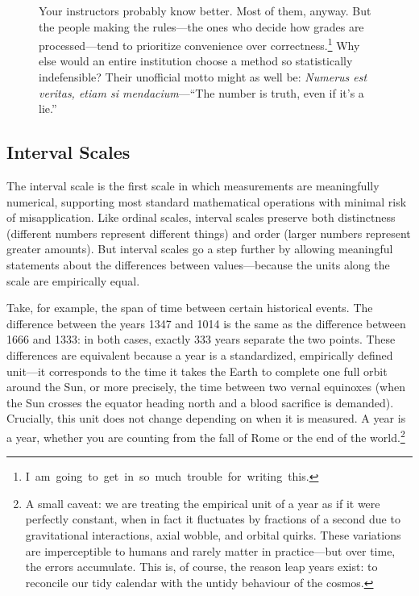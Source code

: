 \begin{figure}[htpb]
\begin{mdframed}[nobreak = true, style = miscFrame, frametitle = \Large\IMFellEnglish Box 4.1: The GPA Illusion]
\begin{spacing}{1.25}
Your instructors probably know better. Most of them, anyway. But the people making the rules—the ones who decide how grades are processed—tend to prioritize convenience over \mbox{correctness.\footnote{I am going to get in so much trouble for writing this.}} Why else would an entire institution choose a method so statistically indefensible? Their unofficial motto might as well be: \textit{Numerus est veritas, etiam si mendacium}—\enquote{The number is truth, even if it’s a lie.}
\end{spacing}
\end{mdframed}
\end{figure}

\subsection{Interval Scales}
\label{sec:interval}

The \gls{interval scale} is the first scale in which measurements are meaningfully numerical, supporting most standard mathematical operations with minimal risk of misapplication. Like ordinal scales, interval scales preserve both distinctness (different numbers represent different things) and order (larger numbers represent greater amounts). But interval scales go a step further by allowing meaningful statements about the differences between values—because the units along the scale are empirically equal.

Take, for example, the span of time between certain historical events. The difference between the years 1347 and 1014 is the same as the difference between 1666 and 1333: in both cases, exactly 333 years separate the two points. These differences are equivalent because a year is a standardized, empirically defined unit—it corresponds to the time it takes the Earth to complete one full orbit around the Sun, or more precisely, the time between two vernal equinoxes (when the Sun crosses the equator heading north and a blood sacrifice is demanded). Crucially, this unit does not change depending on when it is measured. A year is a year, whether you are counting from the fall of Rome or the end of the world.\footnote{A small caveat: we are treating the empirical unit of a year as if it were perfectly constant, when in fact it fluctuates by fractions of a second due to gravitational interactions, axial wobble, and orbital quirks. These variations are imperceptible to humans and rarely matter in practice—but over time, the errors accumulate. This is, of course, the reason leap years exist: to reconcile our tidy calendar with the untidy behaviour of the cosmos.}

